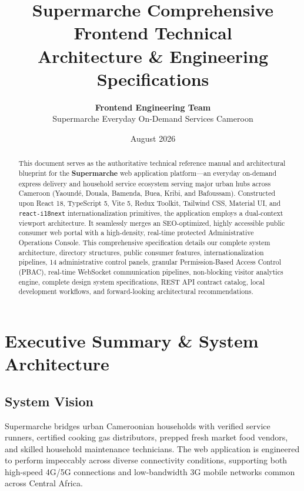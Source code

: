 \documentclass[11pt,a4paper]{article}
\title{\textbf{\huge Supermarche Comprehensive Frontend Technical \\ Architecture \& Engineering Specifications}}
\author{\textbf{Frontend Engineering Team} \\ Supermarche Everyday On-Demand Services Cameroon}
\date{August 2026}
\begin{document}
\maketitle

\begin{abstract}
This document serves as the authoritative technical reference manual and architectural blueprint for the \textbf{Supermarche} web application platform---an everyday on-demand express delivery and household service ecosystem serving major urban hubs across Cameroon (Yaound\'e, Douala, Bamenda, Buea, Kribi, and Bafoussam). Constructed upon React 18, TypeScript 5, Vite 5, Redux Toolkit, Tailwind CSS, Material UI, and \texttt{react-i18next} internationalization primitives, the application employs a dual-context viewport architecture. It seamlessly merges an SEO-optimized, highly accessible public consumer web portal with a high-density, real-time protected Administrative Operations Console. This comprehensive specification details our complete system architecture, directory structures, public consumer features, internationalization pipelines, 14 administrative control panels, granular Permission-Based Access Control (PBAC), real-time WebSocket communication pipelines, non-blocking visitor analytics engine, complete design system specifications, REST API contract catalog, local development workflows, and forward-looking architectural recommendations.
\end{abstract}

\tableofcontents
\newpage

\section{Executive Summary \& System Architecture}

\subsection{System Vision}
Supermarche bridges urban Cameroonian households with verified service runners, certified cooking gas distributors, prepped fresh market food vendors, and skilled household maintenance technicians. The web application is engineered to perform impeccably across diverse connectivity conditions, supporting both high-speed 4G/5G connections and low-bandwidth 3G mobile networks common across Central Africa.
\end{document}
